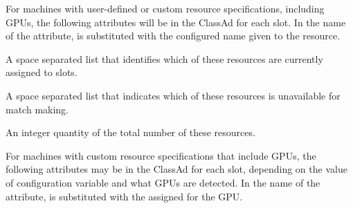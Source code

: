For machines with user-defined or custom resource specifications,
including GPUs, 
the following attributes will be in the ClassAd for each slot.
In the name of the attribute,
 is substituted with the configured name given to the resource.

\begin{description}

\item[\AdAttr{Assigned<name>}:] A space separated list that 
identifies which of these resources are currently assigned to slots.

\item[\AdAttr{Offline<name>}:] A space separated list that
indicates which of these resources is unavailable for match making.

\item[\AdAttr{Total<name>}:] An integer quantity of the total number of
these resources.

\end{description}

For machines with custom resource specifications that include GPUs,
the following attributes may be in the ClassAd for each slot,
depending on the value of configuration variable
and what GPUs are detected.
In the name of the attribute,
 is substituted with the  
assigned for the GPU.

